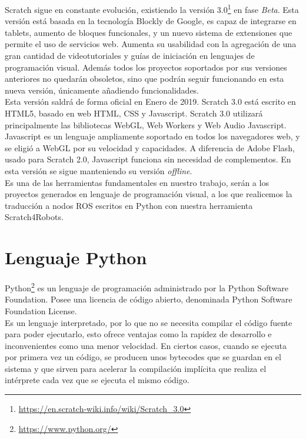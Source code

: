 Scratch sigue en constante evolución, existiendo la versión 3.0\footnote{\url{https://en.scratch-wiki.info/wiki/Scratch_3.0}} en fase \textit{Beta}. Esta versión está basada en la tecnología Blockly de Google, es capaz de integrarse en tablets, aumento de bloques funcionales, y un nuevo sistema de extensiones que permite el uso de servicios web. Aumenta su usabilidad con la agregación de una gran cantidad de videotutoriales y guías de iniciación en lenguajes de programación visual. Además todos los proyectos soportados por sus versiones anteriores no quedarán obsoletos, sino que podrán seguir funcionando en esta nueva versión, únicamente añadiendo funcionalidades.\\

Esta versión saldrá de forma oficial en Enero de 2019. Scratch 3.0 está escrito en HTML5, basado en web HTML, CSS y Javascript. Scratch 3.0 utilizará principalmente las bibliotecas WebGL, Web Workers y Web Audio Javascript. Javascript es un lenguaje ampliamente soportado en todos los navegadores web, y se eligió a WebGL por su velocidad y capacidades. A diferencia de Adobe Flash, usado para Scratch 2.0, Javascript funciona sin necesidad de complementos. En esta versión se sigue manteniendo su versión \textit{offline}.\\

Es una de las herramientas fundamentales en nuestro trabajo, serán a los proyectos generados en lenguaje de programación visual, a los que realicemos la traducción a nodos ROS escritos en Python con nuestra herramienta Scratch4Robots.

\section{Lenguaje Python}
\label{sec:python}
 
Python\footnote{\url{https://www.python.org/}} es un lenguaje de programación administrado por la Python Software Foundation. Posee una licencia de código abierto, denominada Python Software Foundation License.\\

Es un lenguaje interpretado, por lo que no se necesita compilar el código fuente para poder ejecutarlo, esto ofrece ventajas como la rapidez de desarrollo e inconvenientes como una menor velocidad. En ciertos casos, cuando se ejecuta por primera vez un código, se producen unos bytecodes que se guardan en el sistema y que sirven para acelerar la compilación implícita que realiza el intérprete cada vez que se ejecuta el mismo código. \\

